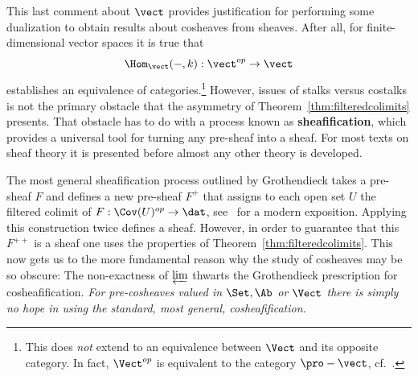This last comment about $\vect$ provides justification for performing some dualization to obtain results about cosheaves from sheaves. After all, for finite-dimensional vector spaces it is true that
\[
	\Hom_{\vect}(-,k):\vect^{op}\to\vect
\]
establishes an equivalence of categories.\footnote{This does \emph{not} extend to an equivalence between $\Vect$ and its opposite category. In fact, $\Vect^{op}$ is equivalent to the category $\pro-\vect$, cf.~\cite[Rmk.6.2]{isaksen-pro}.} However, issues of stalks versus costalks is not the primary obstacle that the asymmetry of Theorem~\ref{thm:filteredcolimits} presents. That obstacle has to do with a process known as \textbf{sheafification}, which provides a universal tool for turning any pre-sheaf into a sheaf. For most texts on sheaf theory it is presented before almost any other theory is developed.

The most general sheafification process outlined by Grothendieck takes a pre-sheaf $F$ and defines a new pre-sheaf $F^+$ that assigns to each open set $U$ the filtered colimit of $F:\Cov(U)^{op}\to\dat$, see~\cite[Sec. 17.4]{KS-CS} for a modern exposition. Applying this construction twice defines a sheaf. However, in order to guarantee that this $F^{++}$ is a sheaf one uses the properties of Theorem~\ref{thm:filteredcolimits}. This now gets us to the more fundamental reason why the study of cosheaves may be so obscure: The non-exactness of $\varprojlim$ thwarts the Grothendieck prescription for cosheafification. \emph{For pre-cosheaves valued in $\Set, \Ab$ or $\Vect$ there is simply no hope in using the standard, most general, cosheafification.}

